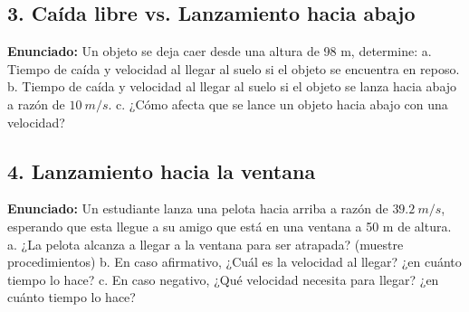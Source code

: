 \documentclass[12pt, letterpaper]{article}
\begin{document}
	
	\subsection*{3. Caída libre vs. Lanzamiento hacia abajo}
	\noindent \textbf{Enunciado:} Un objeto se deja caer desde una altura de 98 m, determine: a. Tiempo de caída y velocidad al llegar al suelo si el objeto se encuentra en reposo. b. Tiempo de caída y velocidad al llegar al suelo si el objeto se lanza hacia abajo a razón de $10~m/s$. c. ¿Cómo afecta que se lance un objeto hacia abajo con una velocidad?
	
	
	\subsection*{4. Lanzamiento hacia la ventana}
	\noindent \textbf{Enunciado:} Un estudiante lanza una pelota hacia arriba a razón de $39.2~m/s$, esperando que esta llegue a su amigo que está en una ventana a 50 m de altura. a. ¿La pelota alcanza a llegar a la ventana para ser atrapada? (muestre procedimientos) b. En caso afirmativo, ¿Cuál es la velocidad al llegar? ¿en cuánto tiempo lo hace? c. En caso negativo, ¿Qué velocidad necesita para llegar? ¿en cuánto tiempo lo hace?
	
\end{document}
